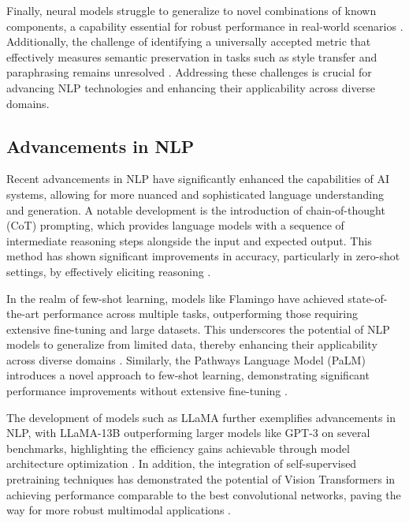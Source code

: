 Finally, neural models struggle to generalize to novel combinations of known components, a capability essential for robust performance in real-world scenarios \cite{zheng2023layerwiserepresentationfusioncompositional}. Additionally, the challenge of identifying a universally accepted metric that effectively measures semantic preservation in tasks such as style transfer and paraphrasing remains unresolved \cite{yamshchikov2020styletransferparaphraselookingsensible}. Addressing these challenges is crucial for advancing NLP technologies and enhancing their applicability across diverse domains.



\subsection{Advancements in NLP} \label{subsec:Advancements in NLP}

Recent advancements in NLP have significantly enhanced the capabilities of AI systems, allowing for more nuanced and sophisticated language understanding and generation. A notable development is the introduction of chain-of-thought (CoT) prompting, which provides language models with a sequence of intermediate reasoning steps alongside the input and expected output. This method has shown significant improvements in accuracy, particularly in zero-shot settings, by effectively eliciting reasoning \cite{kojima2022large}. 



In the realm of few-shot learning, models like Flamingo have achieved state-of-the-art performance across multiple tasks, outperforming those requiring extensive fine-tuning and large datasets. This underscores the potential of NLP models to generalize from limited data, thereby enhancing their applicability across diverse domains \cite{alayrac2022flamingo}. Similarly, the Pathways Language Model (PaLM) introduces a novel approach to few-shot learning, demonstrating significant performance improvements without extensive fine-tuning \cite{chowdhery2023palm}.



The development of models such as LLaMA further exemplifies advancements in NLP, with LLaMA-13B outperforming larger models like GPT-3 on several benchmarks, highlighting the efficiency gains achievable through model architecture optimization \cite{touvron2023llama}. In addition, the integration of self-supervised pretraining techniques has demonstrated the potential of Vision Transformers in achieving performance comparable to the best convolutional networks, paving the way for more robust multimodal applications \cite{alayrac2022flamingo}.



